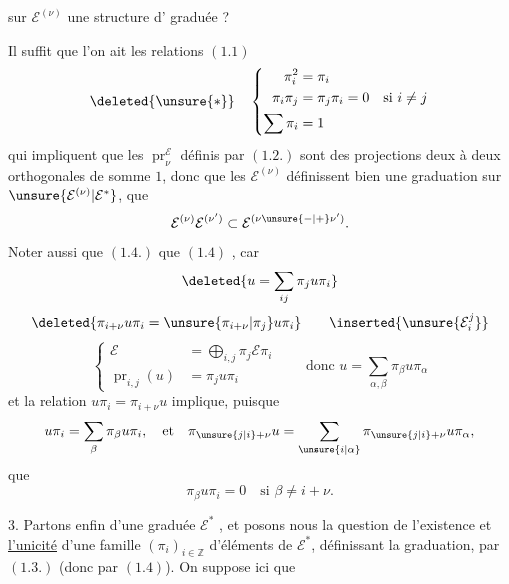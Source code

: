 sur $\mathcal E^{(\nu)}$ une structure d' graduée ?

Il suffit que l'on ait les relations $(1.1)$
\[
\deleted{\unsure{*}}\quad\left\{\begin{aligned}
\pi_i^2&=\pi_i\\
\pi_i\pi_j&=\pi_j\pi_i=0\quad\text{si }i\neq j\\
\sum\pi_i&=1
\end{aligned}\right.
\]
qui impliquent que les $\operatorname{pr}_{\nu}^{\mathcal E}$ définis par $(1.2.)$ sont des projections deux à deux orthogonales de somme $1$, donc que les $\mathcal E^{(\nu)}$ définissent bien une graduation  sur $\unsure{\mathcal E^{(\nu)}|\mathcal E^*}$,  que
\[
\mathcal E^{(\nu)}\mathcal E^{(\nu')}\subset\mathcal E^{(\nu\unsure{-|+}\nu')}.
\]
Noter aussi que $(1.4.)$ que $(1.4)$ , car 
\[
\deleted{u=\sum_{ij}\pi_j u\pi_i}
\]
\[
\deleted{\pi_{i+\nu}u\pi_i=\unsure{\pi_{i+\nu}|\pi_j}u\pi_i}
\qquad\inserted{\unsure{\mathcal E_i^j}}
\]
\[
\left\{\begin{aligned}
\mathcal E&=\bigoplus_{i,j}\pi_j\mathcal E\pi_i\\
\operatorname{pr}_{i,j}(u)&=\pi_j u\pi_i
\end{aligned}\right.
\qquad\text{donc }u=\sum_{\alpha,\beta}\pi_\beta u\pi_\alpha
\]
et la relation $u\pi_i=\pi_{i+\nu}u$ implique, puisque
\[
u\pi_i=\sum_\beta\pi_\beta u\pi_i,\quad\text{et}\quad
\pi_{\unsure{j|i}+\nu}u=\sum_{\unsure{i|\alpha}}\pi_{\unsure{j|i}+\nu}u\pi_\alpha,
\]
que
\[
\pi_\beta u\pi_i=0\quad\text{si }\beta\neq i+\nu.
\]

3.  Partons enfin d'une  graduée $\mathcal E^*$ , et posons nous la question de l'existence et \uline{l'unicité} d'une famille $(\pi_i)_{i\in\mathbb Z}$ d'éléments de $\mathcal E^*$,  définissant la graduation, par $(1.3.)$ (donc par $(1.4)$). On  suppose ici que
